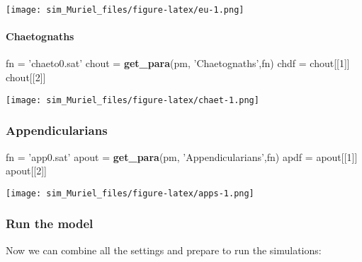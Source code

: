 \documentclass[
]{article}
\newenvironment{Shaded}{\begin{snugshade}}{\end{snugshade}}
\newcommand{\DecValTok}[1]{\textcolor[rgb]{0.00,0.00,0.81}{#1}}
\newcommand{\KeywordTok}[1]{\textcolor[rgb]{0.13,0.29,0.53}{\textbf{#1}}}
\newcommand{\NormalTok}[1]{#1}
\newcommand{\StringTok}[1]{\textcolor[rgb]{0.31,0.60,0.02}{#1}}
\begin{document}
\texttt{[image: sim\_Muriel\_files/figure-latex/eu-1.png]}

\hypertarget{chaetognaths}{%
\paragraph{Chaetognaths}\label{chaetognaths}}

\begin{Shaded}
\begin{Highlighting}[]
\NormalTok{fn =}\StringTok{ 'chaeto0.sat'}
\NormalTok{chout =}\StringTok{ }\KeywordTok{get_para}\NormalTok{(pm, }\StringTok{'Chaetognaths'}\NormalTok{,fn)}
\NormalTok{chdf =}\StringTok{ }\NormalTok{chout[[}\DecValTok{1}\NormalTok{]]}
\NormalTok{chout[[}\DecValTok{2}\NormalTok{]]}
\end{Highlighting}
\end{Shaded}

\texttt{[image: sim\_Muriel\_files/figure-latex/chaet-1.png]}

\hypertarget{appendicularians}{%
\subsubsection{Appendicularians}\label{appendicularians}}

\begin{Shaded}
\begin{Highlighting}[]
\NormalTok{fn =}\StringTok{ 'app0.sat'}
\NormalTok{apout =}\StringTok{ }\KeywordTok{get_para}\NormalTok{(pm, }\StringTok{'Appendicularians'}\NormalTok{,fn)}
\NormalTok{apdf =}\StringTok{ }\NormalTok{apout[[}\DecValTok{1}\NormalTok{]]}
\NormalTok{apout[[}\DecValTok{2}\NormalTok{]]}
\end{Highlighting}
\end{Shaded}

\texttt{[image: sim\_Muriel\_files/figure-latex/apps-1.png]}

\hypertarget{run-the-model}{%
\subsubsection{Run the model}\label{run-the-model}}

Now we can combine all the settings and prepare to run the simulations:
\end{document}
